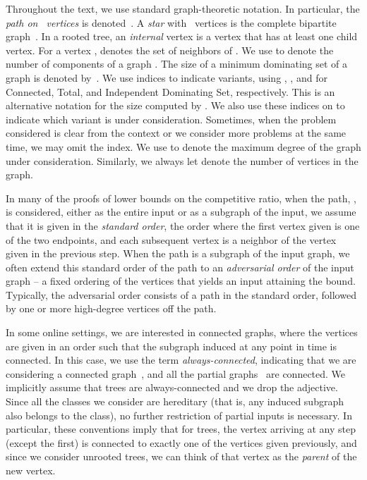 Throughout the text, we use standard graph-theoretic notation.
In particular, the \emph{path on~ vertices} is denoted~.
A {\em star} with ~vertices is the complete bipartite graph~.
In a rooted tree, an {\em internal} vertex is a vertex that has at
least one child vertex.
For a vertex ,  denotes the set of neighbors of .
We  use  to denote the number of components of a graph .
The size of a minimum
dominating set of a graph  is denoted by~.
We use indices to
indicate variants, using , , and 
for Connected, Total, and Independent Dominating Set, respectively.
This is an alternative notation for the size computed by \offopt.
We also use these indices on  to indicate which
variant is under consideration.
Sometimes, when the problem considered is clear from the context or
we consider more problems at the same time, we may omit the index.
We use  to denote the maximum degree of the graph under
consideration.
Similarly, we always let  denote the number of vertices in the
graph.

In many of the proofs of lower bounds on the competitive ratio, 
when the path, , is considered, either as the entire input
or as a subgraph of the input,
we assume that it is given in the \emph{standard order}, the order
where the first vertex given is one of the two endpoints, and each
subsequent vertex 
is a neighbor of the vertex given in the previous step.
When the path is a subgraph of the input graph, we often
extend this standard order of the path to
an \emph{adversarial order} of the input graph -- a fixed ordering of the 
vertices that yields an input attaining the bound.
Typically, the adversarial order consists of a path in the 
standard order, followed by one or more high-degree vertices
off the path.

In some online settings,
we are interested in connected graphs, where the vertices are given
in an order such that the subgraph induced at any point
in time is connected.
In this case, we use the term
\emph{always-connected},
indicating that we are considering a connected graph~, and
all the partial graphs~ are connected.
We implicitly assume that trees are always-connected and we drop the adjective.
Since all the classes we consider are hereditary (that is, any induced subgraph
also belongs to the class), no further restriction of partial inputs
 is necessary. In particular, these conventions 
imply that for trees, the vertex arriving at any step (except the first) is
connected to exactly one of the vertices given previously, and since we
consider unrooted trees, we can think of that vertex as the \emph{parent} of the
new vertex.


